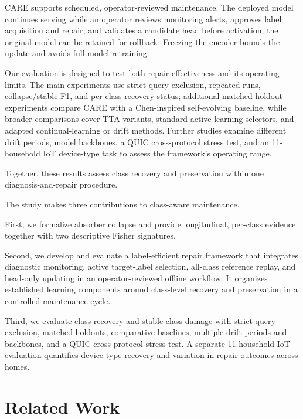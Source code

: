 \documentclass[journal]{IEEEtran}
\newcommand{\ours}{CARE}  %
\begin{document}
\ours{} supports scheduled, operator-reviewed maintenance. The deployed model continues serving while an operator reviews monitoring alerts, approves label acquisition and repair, and validates a candidate head before activation; the original model can be retained for rollback. Freezing the encoder bounds the update and avoids full-model retraining.

Our evaluation is designed to test both repair effectiveness and its operating limits.
The main experiments use strict query exclusion, repeated runs, collapse/stable F1, and per-class recovery status; additional matched-holdout experiments compare \ours{} with a Chen-inspired self-evolving baseline, while broader comparisons cover TTA variants, standard active-learning selectors, and adapted continual-learning or drift methods.
Further studies examine different drift periods, model backbones, a QUIC cross-protocol stress test, and an 11-household IoT device-type task to assess the framework's operating range.

Together, these results assess class recovery and preservation within one diagnosis-and-repair procedure.

The study makes three contributions to class-aware maintenance.

First, we formalize absorber collapse and provide longitudinal, per-class evidence together with two descriptive Fisher signatures.

Second, we develop and evaluate a label-efficient repair framework that integrates diagnostic monitoring, active target-label selection, all-class reference replay, and head-only updating in an operator-reviewed offline workflow. It organizes established learning components around class-level recovery and preservation in a controlled maintenance cycle.

Third, we evaluate class recovery and stable-class damage with strict query exclusion, matched holdouts, comparative baselines, multiple drift periods and backbones, and a QUIC cross-protocol stress test. A separate 11-household IoT evaluation quantifies device-type recovery and variation in repair outcomes across homes.


\section{Related Work}
\label{sec:related}
\end{document}
